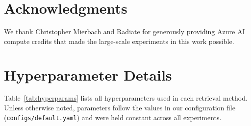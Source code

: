 \documentclass[11pt]{article}
\begin{document}
\section*{Acknowledgments}
We thank Christopher Mierbach and Radiate for generously providing Azure AI compute credits that made the large-scale experiments in this work possible.




\appendix

\section{Hyperparameter Details}
\label{app:hyperparams}

Table~\ref{tab:hyperparams} lists all hyperparameters used in each retrieval method. Unless otherwise noted, parameters follow the values in our configuration file (\texttt{configs/default.yaml}) and were held constant across all experiments.
\end{document}
